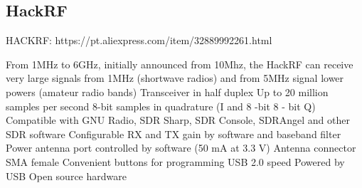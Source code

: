 \documentclass[
  12pt,				%
  openright,			%
  twoside,			%
  a4paper,			%
  english,			%
  french,				%
  spanish,			%
  brazil,				%
  ]{abntex2}
\begin{document}











\subsection*{HackRF}

HACKRF: https://pt.aliexpress.com/item/32889992261.html

From 1MHz to 6GHz, initially announced from 10Mhz, the HackRF can receive very large signals from 1MHz (shortwave radios) and from 5MHz signal lower powers (amateur radio bands)
Transceiver in half duplex
Up to 20 million samples per second
8-bit samples in quadrature (I and 8 -bit 8 - bit Q)
Compatible with GNU Radio, SDR Sharp, SDR Console, SDRAngel and other SDR software
Configurable RX and TX gain by software and baseband filter
Power antenna port controlled by software (50 mA at 3.3 V)
Antenna connector SMA female
Convenient buttons for programming
USB 2.0 speed
Powered by USB Open source hardware
\end{document}
